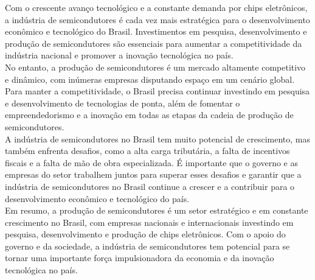 Com o crescente avanço tecnológico e a constante demanda por chips eletrônicos, a indústria de semicondutores é cada vez mais estratégica para o desenvolvimento econômico e tecnológico do Brasil. Investimentos em pesquisa, desenvolvimento e produção de semicondutores são essenciais para aumentar a competitividade da indústria nacional e promover a inovação tecnológica no país.\\
No entanto, a produção de semicondutores é um mercado altamente competitivo e dinâmico, com inúmeras empresas disputando espaço em um cenário global. Para manter a competitividade, o Brasil precisa continuar investindo em pesquisa e desenvolvimento de tecnologias de ponta, além de fomentar o empreendedorismo e a inovação em todas as etapas da cadeia de produção de semicondutores.\\
A indústria de semicondutores no Brasil tem muito potencial de crescimento, mas também enfrenta desafios, como a alta carga tributária, a falta de incentivos fiscais e a falta de mão de obra especializada. É importante que o governo e as empresas do setor trabalhem juntos para superar esses desafios e garantir que a indústria de semicondutores no Brasil continue a crescer e a contribuir para o desenvolvimento econômico e tecnológico do país.\\
Em resumo, a produção de semicondutores é um setor estratégico e em constante crescimento no Brasil, com empresas nacionais e internacionais investindo em pesquisa, desenvolvimento e produção de chips eletrônicos. Com o apoio do governo e da sociedade, a indústria de semicondutores tem potencial para se tornar uma importante força impulsionadora da economia e da inovação tecnológica no país.







  

